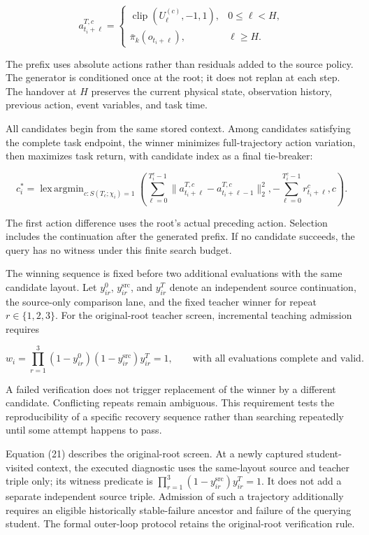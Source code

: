 \documentclass[
  american,
  11pt,
  a4paper,
]{article}
\begin{document}
\[
a_{t_i+\ell}^{T,c}=
\begin{cases}
\operatorname{clip}(U_\ell^{(c)},-1,1),&0\le\ell<H,\\
\bar\pi_k(o_{t_i+\ell}),&\ell\ge H.
\end{cases}
\tag{19}\label{eq:19}
\]

The prefix uses absolute actions rather than residuals added to the
source policy. The generator is conditioned once at the root; it does
not replan at each step. The handover at \(H\) preserves the current
physical state, observation history, previous action, event variables,
and task time.

All candidates begin from the same stored context. Among candidates
satisfying the complete task endpoint, the winner minimizes
full-trajectory action variation, then maximizes task return, with
candidate index as a final tie-breaker:

\[
c_i^*=\mathop{\operatorname{lex\,argmin}}_{c:S(T_c;\chi_i)=1}
\left(
\sum_{\ell=0}^{T_i^c-1}\|a_{t_i+\ell}^{T,c}-a_{t_i+\ell-1}^{T,c}\|_2^2,
-\sum_{\ell=0}^{T_i^c-1}r_{t_i+\ell}^{c},c
\right).
\tag{20}\label{eq:20}
\]

The first action difference uses the root's actual preceding action.
Selection includes the continuation after the generated prefix. If no
candidate succeeds, the query has no witness under this finite search
budget.

The winning sequence is fixed before two additional evaluations with the
same candidate layout. Let \(y_{ir}^0\), \(y_{ir}^{\mathrm{src}}\), and
\(y_{ir}^{T}\) denote an independent source continuation, the
source-only comparison lane, and the fixed teacher winner for repeat
\(r\in\{1,2,3\}\). For the original-root teacher screen, incremental
teaching admission requires

\[
w_i=
\prod_{r=1}^{3}
(1-y_{ir}^0)(1-y_{ir}^{\mathrm{src}})y_{ir}^{T}=1,
\qquad\text{with all evaluations complete and valid}.
\tag{21}\label{eq:21}
\]

A failed verification does not trigger replacement of the winner by a
different candidate. Conflicting repeats remain ambiguous. This
requirement tests the reproducibility of a specific recovery sequence
rather than searching repeatedly until some attempt happens to pass.

Equation (21) describes the original-root screen. At a newly captured
student-visited context, the executed diagnostic uses the same-layout
source and teacher triple only; its witness predicate is
\(\prod_{r=1}^{3}(1-y_{ir}^{\mathrm{src}})y_{ir}^{T}=1\). It does not
add a separate independent source triple. Admission of such a trajectory
additionally requires an eligible historically stable-failure ancestor
and failure of the querying student. The formal outer-loop protocol
retains the original-root verification rule.
\end{document}
